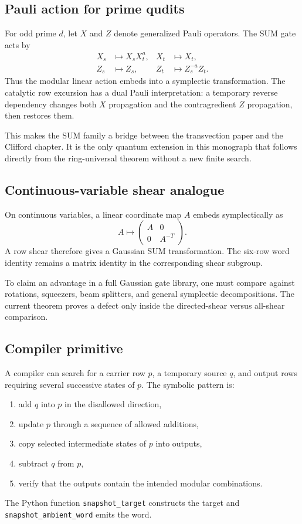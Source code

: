 \subsection{Pauli action for prime qudits}
For odd prime $d$, let $X$ and $Z$ denote generalized Pauli operators.  The SUM gate acts by
\begin{align*}
X_s&\mapsto X_sX_t^a,
&
X_t&\mapsto X_t,\\
Z_s&\mapsto Z_s,
&
Z_t&\mapsto Z_s^{-a}Z_t.
\end{align*}
Thus the modular linear action embeds into a symplectic transformation.  The catalytic row excursion has a dual Pauli interpretation: a temporary reverse dependency changes both $X$ propagation and the contragredient $Z$ propagation, then restores them.

This makes the SUM family a bridge between the transvection paper and the Clifford chapter.  It is the only quantum extension in this monograph that follows directly from the ring-universal theorem without a new finite search.

\subsection{Continuous-variable shear analogue}
On continuous variables, a linear coordinate map $A$ embeds symplectically as
\[
A\longmapsto
\begin{pmatrix}
A&0\\
0&A^{-T}
\end{pmatrix}.
\]
A row shear therefore gives a Gaussian SUM transformation.  The six-row word identity remains a matrix identity in the corresponding shear subgroup.

\begin{skeletonbox}
To claim an advantage in a full Gaussian gate library, one must compare against rotations, squeezers, beam splitters, and general symplectic decompositions.  The current theorem proves a defect only inside the directed-shear versus all-shear comparison.
\end{skeletonbox}

\subsection{Compiler primitive}
A compiler can search for a carrier row $p$, a temporary source $q$, and output rows requiring several successive states of $p$.  The symbolic pattern is:
\begin{enumerate}
\item add $q$ into $p$ in the disallowed direction,
\item update $p$ through a sequence of allowed additions,
\item copy selected intermediate states of $p$ into outputs,
\item subtract $q$ from $p$,
\item verify that the outputs contain the intended modular combinations.
\end{enumerate}
The Python function \texttt{snapshot\_target} constructs the target and \texttt{snapshot\_ambient\_word} emits the word.

